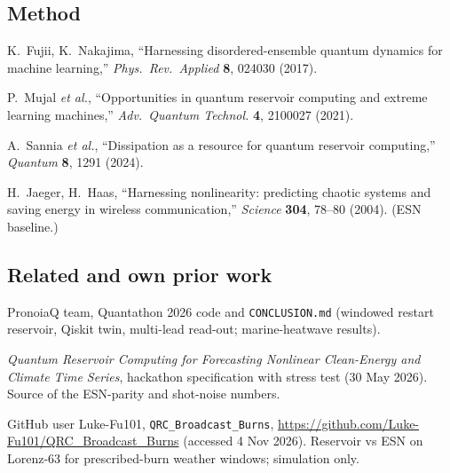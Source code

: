 \documentclass[11pt,a4paper]{article}
\newcommand{\code}[1]{\texttt{\small #1}}
\begin{document}
\subsection*{Method}
\begin{enumerate}[label={[M\arabic*]},leftmargin=3em]
\item K.~Fujii, K.~Nakajima, ``Harnessing disordered-ensemble quantum dynamics for machine learning,''
  \emph{Phys.\ Rev.\ Applied} \textbf{8}, 024030 (2017).
\item P.~Mujal \emph{et al.}, ``Opportunities in quantum reservoir computing and extreme learning machines,''
  \emph{Adv.\ Quantum Technol.} \textbf{4}, 2100027 (2021).
\item A.~Sannia \emph{et al.}, ``Dissipation as a resource for quantum reservoir computing,''
  \emph{Quantum} \textbf{8}, 1291 (2024).
\item H.~Jaeger, H.~Haas, ``Harnessing nonlinearity: predicting chaotic systems and saving energy in wireless
  communication,'' \emph{Science} \textbf{304}, 78--80 (2004). (ESN baseline.)
\end{enumerate}

\subsection*{Related and own prior work}
\begin{enumerate}[label={[P\arabic*]},leftmargin=3em]
\item PronoiaQ team, Quantathon 2026 code and \code{CONCLUSION.md} (windowed restart reservoir, Qiskit twin,
  multi-lead read-out; marine-heatwave results).
\item \emph{Quantum Reservoir Computing for Forecasting Nonlinear Clean-Energy and Climate Time Series},
  hackathon specification with stress test (30 May 2026). Source of the ESN-parity and shot-noise numbers.
\item GitHub user Luke-Fu101, \code{QRC\_Broadcast\_Burns}, \url{https://github.com/Luke-Fu101/QRC_Broadcast_Burns}
  (accessed 4 Nov 2026). Reservoir vs ESN on Lorenz-63 for prescribed-burn weather windows; simulation only.
\end{enumerate}
\end{document}
